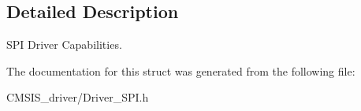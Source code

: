 \subsection{Detailed Description}
S\+PI Driver Capabilities. 

The documentation for this struct was generated from the following file\+:\begin{DoxyCompactItemize}
\item 
C\+M\+S\+I\+S\+\_\+driver/Driver\+\_\+\+S\+P\+I.\+h\end{DoxyCompactItemize}
